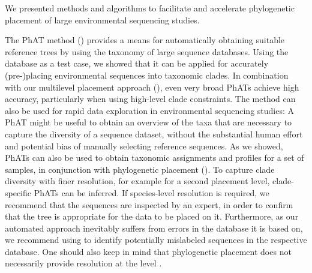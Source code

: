We presented methods and algorithms to facilitate and accelerate
phylogenetic placement of large environmental sequencing studies. %

The \acf{PhAT} method () provides a means
for automatically obtaining suitable reference trees by using the taxonomy of large sequence databases.
Using the  database as a test case,
we showed that it can be applied for accurately (pre-)placing environmental sequences into taxonomic clades.
In combination with our multilevel placement approach (),
even very broad \acp{PhAT} achieve high accuracy, particularly when using high-level clade constraints.
The method can also be used for rapid data exploration in environmental sequencing studies:
A \ac{PhAT} might be useful to obtain an overview of the taxa that are necessary to capture the diversity of a sequence dataset,
without the substantial human effort and potential bias of manually selecting reference sequences.
As we showed, \acp{PhAT} can also be used to obtain taxonomic assignments and profiles for a set of samples,
in conjunction with phylogenetic placement ().
To capture clade diversity with finer resolution, for example for a second placement level,
clade-specific \acp{PhAT} can be inferred.
If species-level resolution is required, we recommend that the sequences are inspected by an expert,
in order to confirm that the tree is appropriate for the data to be placed on it.
Furthermore, as our automated approach inevitably suffers from errors in the database it is based on,
we recommend using  \citep{Kozlov2016}
to identify potentially mislabeled sequences in the respective database.
One should also keep in mind that phylogenetic placement
does not necessarily provide resolution at the  level \citep{Dunthorn2014}.

